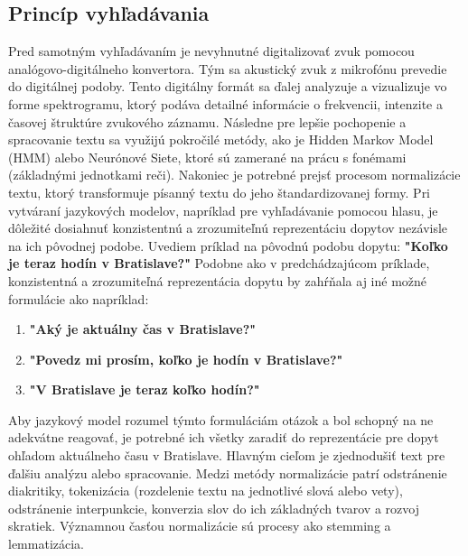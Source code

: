\documentclass[10pt,slovak,a4paper]{article}
\begin{document}
\begin{enumerate}
\subsection{Princíp vyhľadávania}\label{ina}
\leavemode\newline
Pred samotným vyhľadávaním je nevyhnutné digitalizovať zvuk pomocou analógovo-digitálneho konvertora. Tým sa akustický zvuk z mikrofónu prevedie do digitálnej podoby. Tento digitálny formát sa ďalej analyzuje a vizualizuje vo forme spektrogramu, ktorý podáva detailné informácie o frekvencii, intenzite a časovej štruktúre zvukového záznamu.
\leavevmode \newline
\leavevmode \newline
Následne pre lepšie pochopenie a spracovanie textu sa využijú pokročilé metódy, ako je Hidden Markov Model (HMM) alebo Neurónové Siete, ktoré sú zamerané na prácu s fonémami (základnými jednotkami reči).
\leavevmode \newline
\leavevmode \newline
Nakoniec je potrebné prejsť procesom normalizácie textu, ktorý transformuje písanný textu do jeho štandardizovanej formy. Pri vytváraní jazykových modelov, napríklad pre vyhľadávanie pomocou hlasu, je dôležité dosiahnuť konzistentnú a zrozumiteľnú reprezentáciu dopytov nezávisle na ich pôvodnej podobe. Uvediem príklad na pôvodnú podobu dopytu:
\newline
\newline
\textbf{"Koľko je teraz hodín v Bratislave?"}	
\newline
\newline
Podobne ako v predchádzajúcom príklade, konzistentná a zrozumiteľná reprezentácia dopytu by zahŕňala aj iné možné formulácie ako napríklad:
\begin{enumerate}[label=\Roman*.]
  \item\textbf{"Aký je aktuálny čas v Bratislave?"}
  \item\textbf{"Povedz mi prosím, koľko je hodín v Bratislave?"}
  \item\textbf{"V Bratislave je teraz koľko hodín?"}
\end{enumerate}   
Aby jazykový model rozumel týmto formuláciám otázok a bol schopný na ne adekvátne reagovať, je potrebné ich všetky zaradiť do reprezentácie pre dopyt ohľadom aktuálneho času v Bratislave.
Hlavným cieľom je zjednodušiť text pre ďalšiu analýzu alebo spracovanie. 
Medzi metódy normalizácie patrí odstránenie diakritiky, tokenizácia (rozdelenie textu na jednotlivé slová alebo vety), odstránenie interpunkcie, konverzia slov do ich základných tvarov a rozvoj skratiek. Významnou časťou normalizácie sú procesy ako stemming a lemmatizácia. 

\end{enumerate}
\end{document}
